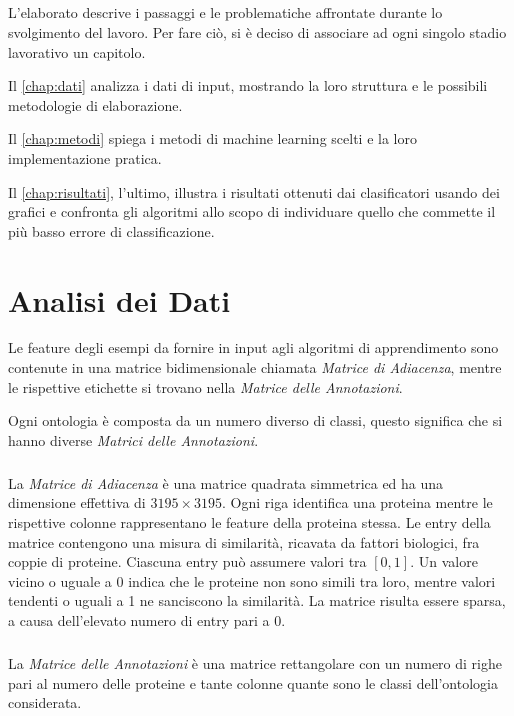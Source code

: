 \documentclass[12pt,a4paper,oneside,hidelinks]{report}
\begin{document}
\paragraph*{}
L'elaborato descrive i passaggi e le problematiche affrontate durante lo svolgimento del lavoro. Per fare ciò, si è deciso di associare ad ogni singolo stadio lavorativo un capitolo. 

Il \autoref{chap:dati} analizza i dati di input, mostrando la loro struttura e le possibili metodologie di elaborazione. 

Il \autoref{chap:metodi} spiega i metodi di machine learning scelti e la loro implementazione pratica. 

Il \autoref{chap:risultati}, l'ultimo, illustra i risultati ottenuti dai clasificatori usando dei grafici e confronta gli algoritmi allo scopo di individuare quello che commette il più basso errore di classificazione.

\chapter{Analisi dei Dati} 
\label{chap:dati}
Le feature degli esempi da fornire in input agli algoritmi di apprendimento sono contenute in una matrice bidimensionale chiamata \textit{Matrice di Adiacenza}, mentre le rispettive etichette si trovano nella \textit{Matrice delle Annotazioni}.

Ogni ontologia è composta da un numero diverso di classi, questo significa che si hanno diverse \textit{Matrici delle Annotazioni}.

\paragraph*{}
La \textit{Matrice di Adiacenza} è una matrice quadrata simmetrica ed ha una dimensione effettiva di $3195 \times 3195$. Ogni riga identifica una proteina mentre le rispettive colonne rappresentano le feature della proteina stessa. Le entry della matrice contengono una misura di similarità, ricavata da fattori biologici, fra coppie di proteine.
Ciascuna entry può assumere valori tra $[0,1]$. Un valore vicino o uguale a 0 indica che le proteine non sono simili tra loro, mentre valori tendenti o uguali a 1 ne sanciscono la similarità. 
La matrice risulta essere sparsa, a causa dell'elevato numero di entry pari a 0.

\paragraph*{}
La \textit{Matrice delle Annotazioni} è una matrice rettangolare con un numero di righe pari al numero delle proteine e tante colonne quante sono le classi dell'ontologia considerata.
\end{document}
